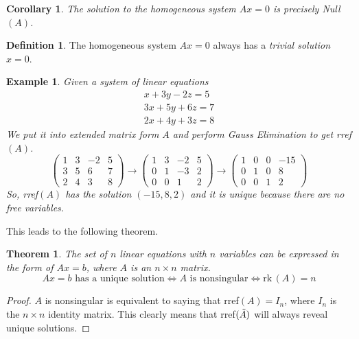 \documentclass{article}
\newtheorem{theorem}{Theorem}[section]
\newtheorem{example}{Example}[section]
\newtheorem{corollary}{Corollary}[theorem]
\theoremstyle{remark}
\theoremstyle{definition}
\newtheorem{definition}{Definition}[section]
\begin{document}
    \begin{corollary}
    The solution to the homogeneous system $A x = 0$ is precisely Null$(A)$. 
    \end{corollary}

    \begin{definition}
    The homogeneous system $A x = 0$ always has a \textit{trivial solution} $x = 0$. 
    \end{definition}

    \begin{example}
    Given a system of linear equations 
    \begin{align*}
        x + 3 y - 2z = 5 \\
        3 x + 5 y + 6 z = 7 \\
        2 x + 4 y + 3 z = 8
    \end{align*}
    We put it into extended matrix form $A$ and perform Gauss Elimination to get rref$(A)$. 
    \[\begin{pmatrix}
    1 & 3&-2&5 \\ 3&5&6&7\\ 2&4&3&8
    \end{pmatrix} \rightarrow \begin{pmatrix}
    1&3&-2&5\\ 0&1&-3&2 \\ 0&0&1&2 \end{pmatrix} \rightarrow \begin{pmatrix}
    1&0&0&-15 \\ 0&1&0&8 \\ 0&0&1&2
    \end{pmatrix}\]
    So, rref$(A)$ has the solution $(-15, 8, 2)$ and it is unique because there are no free variables. 
    \end{example}

    This leads to the following theorem. 

    \begin{theorem}
    The set of $n$ linear equations with $n$ variables can be expressed in the form of $A x = b$, where $A$ is an $n \times n$ matrix. 
    \[ A x = b \text{ has a unique solution} \iff A \text{ is nonsingular} \iff \text{rk}\,(A) = n\]
    \end{theorem}
    \begin{proof}
    $A$ is nonsingular is equivalent to saying that rref$(A) = I_n$, where $I_n$ is the $n \times n$ identity matrix. This clearly means that rref$(\Tilde{A})$ will always reveal unique solutions. 
    \end{proof}
\end{document}
